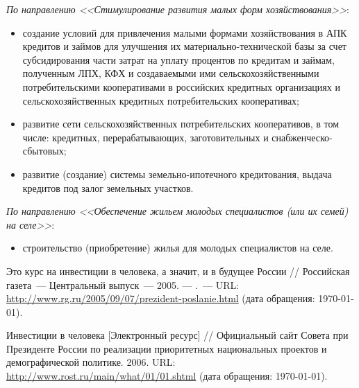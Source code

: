 \documentclass[article, 12pt, russian, oneside]{ncc}
\begin{document}
\emph{По направлению <<Стимулирование развития малых форм хозяйствования>>}:

\begin{itemize}
\item создание условий для привлечения малыми формами хозяйствования в
  АПК кредитов и займов для улучшения их материально-технической базы
  за счет субсидирования части затрат на уплату процентов по кредитам
  и займам, полученным ЛПХ, КФХ и создаваемыми ими
  сельскохозяйственными потребительскими кооперативами в российских
  кредитных организациях и сельскохозяйственных кредитных
  потребительских кооперативах;
\item развитие сети сельскохозяйственных потребительских кооперативов,
  в том числе: кредитных, перерабатывающих, заготовительных и
  снабженческо-сбытовых;
\item развитие (создание) системы земельно-ипотечного кредитования,
  выдача кредитов под залог земельных участков.
\end{itemize}

\emph{По направлению <<Обеспечение жильем молодых специалистов (или их
  семей) на селе>>}:

\begin{itemize}
\item строительство (приобретение) жилья для молодых специалистов на
  селе.
\end{itemize}

\begin{thebibliography}{30}
 Это курс на инвестиции в человека, а значит, и в
  будущее России // Российская газета~--- Центральный выпуск~---
  2005. — .~---  URL:
  \url{http://www.rg.ru/2005/09/07/prezident-poslanie.html} (дата
  обращения: \today).

 Инвестиции в человека [Электронный ресурс] //
  Официальный сайт Совета при Президенте России по реализации
  приоритетных национальных проектов и демографической
  политике. 2006. URL: \url{http://www.rost.ru/main/what/01/01.shtml}
  (дата обращения: \today).

\end{thebibliography}
\end{document}
